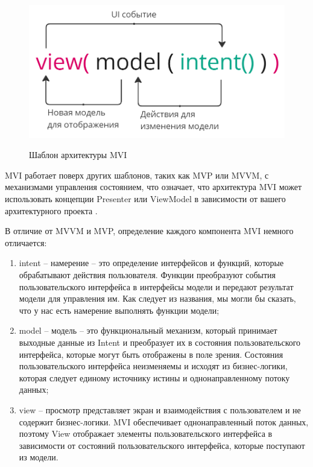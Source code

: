 \begin{figure}[h!]
    \begin{center}
        \includegraphics[width=0.95\hsize]{fig/mvi.png}\\[2mm]
        \caption{Шаблон архитектуры MVI}\label{fig:MVI}
    \end{center}
\end{figure}

MVI работает поверх других шаблонов, таких как MVP или MVVM, с механизмами управления состоянием, что означает, что архитектура MVI может использовать концепции Presenter или ViewModel в зависимости от вашего архитектурного проекта \cite{book:24}.

В отличие от MVVM и MVP, определение каждого компонента MVI немного отличается:

\begin{enumerate}
    \item intent -- намерение -- это определение интерфейсов и функций, которые обрабатывают действия пользователя. Функции преобразуют события пользовательского интерфейса в интерфейсы модели и передают результат модели для управления им. Как следует из названия, мы могли бы сказать, что у нас есть намерение выполнять функции модели;
    \item model -- модель -- это функциональный механизм, который принимает выходные данные из Intent и преобразует их в состояния пользовательского интерфейса, которые могут быть отображены в поле зрения. Состояния пользовательского интерфейса неизменяемы и исходят из бизнес-логики, которая следует единому источнику истины и однонаправленному потоку данных;
    \item view -- просмотр представляет экран и взаимодействия с пользователем и не содержит бизнес-логики. MVI обеспечивает однонаправленный поток данных, поэтому View отображает элементы пользовательского интерфейса в зависимости от состояний пользовательского интерфейса, которые поступают из модели. 
\end{enumerate}





